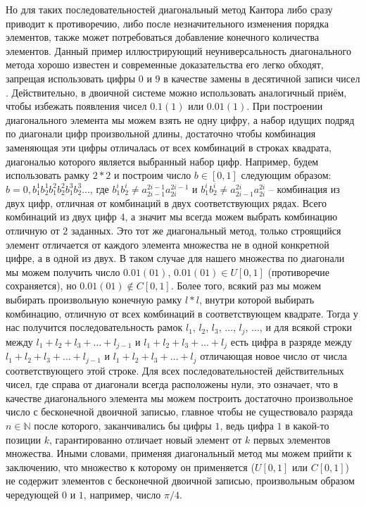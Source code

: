 \documentclass[12pt]{article}
\begin{document}
Но для таких последовательностей диагональный метод Кантора либо сразу приводит к противоречию, либо после незначительного изменения порядка элементов, также может потребоваться добавление конечного количества элементов. Данный пример иллюстрирующий неуниверсальность диагонального метода хорошо известен и современные доказательства его легко обходят, запрещая использовать цифры $0$ и $9$ в качестве замены в десятичной записи чисел \cite{matan-diagonal}. Действительно, в двоичной системе можно использовать аналогичный приём, чтобы избежать появления чисел $0.1(1)$ или $0.01(1)$. При построении диагонального элемента мы можем взять не одну цифру, а набор идущих подряд по диагонали цифр произвольной длины, достаточно чтобы комбинация заменяющая эти цифры отличалась от всех комбинаций в строках квадрата, диагональю которого является выбранный набор цифр. Например, будем использовать рамку $2 * 2$ и построим число $b \in [0, 1]$ следующим образом: $b = 0,b_1^1b_2^1b_1^2b_2^2b_1^3 b_2^3\dots$, где $b_1^ib_2^i \neq a^{2i - 1}_{2i - 1}a^{2i - 1}_{2i}$ и $b_1^ib_2^i \neq a^{2i}_{2i - 1}a^{2i}_{2i}$  – комбинация из двух цифр, отличная от комбинаций в двух соответствующих рядах. Всего комбинаций из двух цифр $4$, а значит мы всегда можем выбрать комбинацию отличную от $2$ заданных. Это тот же диагональный метод, только строящийся элемент отличается от каждого элемента множества не в одной конкретной цифре, а в одной из двух. В таком случае для нашего множества по диагонали мы можем получить число $0.01(01)$, $0.01(01) \in U[0, 1]$ (противоречие сохраняется), но $0.01(01) \notin C[0, 1]$. Более того, всякий раз мы можем выбирать произвольную конечную рамку $l * l$, внутри которой выбирать комбинацию, отличную от всех комбинаций в соответствующем квадрате. Тогда у нас получится последовательность рамок $l_1$, $l_2$, $l_3$, $\dots$, $l_j$, $\dots$, и для всякой строки между $l_1 + l_2 + l_3 + \dots + l_{j - 1}$ и $l_1 + l_2 + l_3 + \dots + l_j$ есть цифра в разряде между $l_1 + l_2 + l_3 + \dots + l_{j - 1}$ и $l_1 + l_2 + l_3 + \dots + l_j$ отличающая новое число от числа соответствующего этой строке. Для всех последовательностей действительных чисел, где справа от диагонали всегда расположены нули, это означает, что в качестве диагонального элемента мы можем построить достаточно произвольное число с бесконечной двоичной записью, главное чтобы не существовало разряда $n \in \mathbb{N}$ после которого, заканчивались бы цифры $1$, ведь цифра $1$ в какой-то позиции $k$, гарантированно отличает новый элемент от $k$ первых элементов множества. Иными словами, применяя диагональный метод мы можем прийти к заключению, что множество к которому он применяется ($U[0, 1]$ или $C[0, 1]$) не содержит элементов с бесконечной двоичной записью, произвольным образом чередующей $0$ и $1$, например, число $\pi/4$.
\end{document}
